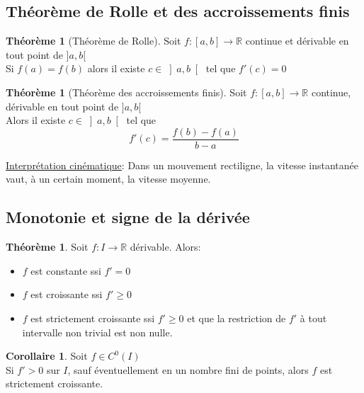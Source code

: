 \documentclass[10pt,a4paper]{article}
\theoremstyle{definition}
\newtheorem{theorem}[proposition]{Théorème}
\newtheorem{corollaire}[proposition]{Corollaire}
\begin{document}
\subsection{Théorème de Rolle et des accroissements finis}
\begin{theorem}[Théorème de Rolle]
Soit $f: [a, b] \to \mathbb{R}$ continue et dérivable en tout point de $]a, b[$ \\
Si $f(a) = f(b)$ alors il existe $c \in \left]a, b\right[$ tel que $f'(c) = 0$
\end{theorem}
\begin{theorem}[Théorème des accroissements finis]
Soit $f: [a, b] \to \mathbb{R}$ continue, \\
dérivable en tout point de $]a, b[$ \\
Alors il existe $c \in \left]a, b\right[$ tel que
\[f'(c) = \frac{f(b) - f(a)}{b - a}\]
\end{theorem}
\medskip
\noindent \uline{Interprétation cinématique}: Dans un mouvement rectiligne, la vitesse instantanée vaut, à un certain moment, la vitesse moyenne.

\subsection{Monotonie et signe de la dérivée}
\begin{theorem}
Soit $f: I \to \mathbb{R}$ dérivable. Alors:
\begin{itemize}
\item $f$ est constante ssi $f' = 0$
\item $f$ est croissante ssi $f' \geq 0$
\item $f$ est strictement croissante ssi $f' \geq 0$ et que la restriction de $f'$ à tout intervalle non trivial est non nulle.
\end{itemize}
\end{theorem}
\begin{corollaire}
Soit $f \in C^0(I)$ \\
Si $f' > 0$ sur $I$, sauf éventuellement en un nombre fini de points, alors $f$ est strictement croissante.
\end{corollaire}
\end{document}
